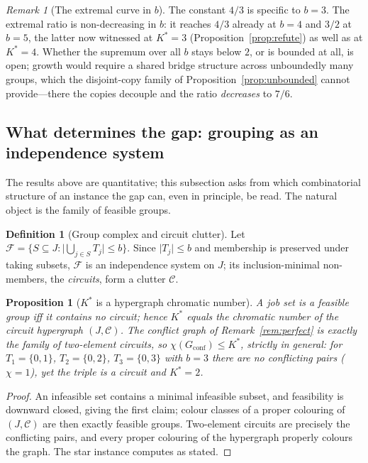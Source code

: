 \documentclass[11pt,a4paper]{article}
\theoremstyle{plain}
\newtheorem{proposition}{Proposition}
\theoremstyle{definition}
\newtheorem{definition}{Definition}
\theoremstyle{remark}
\newtheorem{remark}{Remark}
\newcommand{\Kst}{K^{\ast}}
\begin{document}
\begin{remark}[The extremal curve in $b$]\label{rem:bdep}
The constant $4/3$ is specific to $b=3$. The extremal ratio is non-decreasing
in $b$: it reaches $4/3$ already at $b=4$ and $3/2$ at $b=5$, the latter now
witnessed at $\Kst=3$ (Proposition~\ref{prop:refute}) as well as at $\Kst=4$.
Whether the supremum over all $b$ stays below $2$, or is bounded at all, is
open; growth would require a shared bridge structure across unboundedly many
groups, which the disjoint-copy family of Proposition~\ref{prop:unbounded}
cannot provide---there the copies decouple and the ratio \emph{decreases} to
$7/6$.
\end{remark}

\subsection{What determines the gap: grouping as an independence system}
\label{ssec:clutter}
The results above are quantitative; this subsection asks from which
combinatorial structure of an instance the gap can, even in principle, be
read. The natural object is the family of feasible groups.

\begin{definition}[Group complex and circuit clutter]\label{def:complex}
Let $\mathcal{F}=\{S\subseteq J:\lvert\bigcup_{j\in S}T_j\rvert\le b\}$. Since
$\lvert T_j\rvert\le b$ and membership is preserved under taking subsets,
$\mathcal{F}$ is an independence system on $J$; its inclusion-minimal
non-members, the \emph{circuits}, form a clutter $\mathcal{C}$.
\end{definition}

\begin{proposition}[$\Kst$ is a hypergraph chromatic number]\label{prop:chromK}
A job set is a feasible group iff it contains no circuit; hence $\Kst$ equals
the chromatic number of the circuit hypergraph $(J,\mathcal{C})$. The conflict
graph of Remark~\ref{rem:perfect} is exactly the family of two-element
circuits, so $\chi(G_{\mathrm{conf}})\le\Kst$, strictly in general: for
$T_1=\{0,1\}$, $T_2=\{0,2\}$, $T_3=\{0,3\}$ with $b=3$ there are no conflicting
pairs ($\chi=1$), yet the triple is a circuit and $\Kst=2$.
\end{proposition}
\begin{proof}
An infeasible set contains a minimal infeasible subset, and feasibility is
downward closed, giving the first claim; colour classes of a proper colouring
of $(J,\mathcal{C})$ are then exactly feasible groups. Two-element circuits
are precisely the conflicting pairs, and every proper colouring of the
hypergraph properly colours the graph. The star instance computes as stated.
\end{proof}
\end{document}
